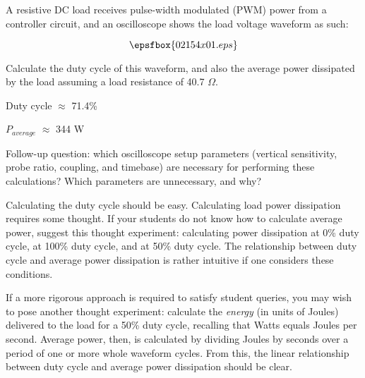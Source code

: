 

A resistive DC load receives pulse-width modulated (PWM) power from a controller circuit, and an oscilloscope shows the load voltage waveform as such:

$$\epsfbox{02154x01.eps}$$

Calculate the duty cycle of this waveform, and also the average power dissipated by the load assuming a load resistance of 40.7 $\Omega$.







Duty cycle $\approx$ 71.4\%

$P_{average}$ $\approx$ 344 W

\vskip 10pt

Follow-up question: which oscilloscope setup parameters (vertical sensitivity, probe ratio, coupling, and timebase) are necessary for performing these calculations?  Which parameters are unnecessary, and why?







Calculating the duty cycle should be easy.  Calculating load power dissipation requires some thought.  If your students do not know how to calculate average power, suggest this thought experiment: calculating power dissipation at 0\% duty cycle, at 100\% duty cycle, and at 50\% duty cycle.  The relationship between duty cycle and average power dissipation is rather intuitive if one considers these conditions.

If a more rigorous approach is required to satisfy student queries, you may wish to pose another thought experiment: calculate the {\it energy} (in units of Joules) delivered to the load for a 50\% duty cycle, recalling that Watts equals Joules per second.  Average power, then, is calculated by dividing Joules by seconds over a period of one or more whole waveform cycles.  From this, the linear relationship between duty cycle and average power dissipation should be clear.




